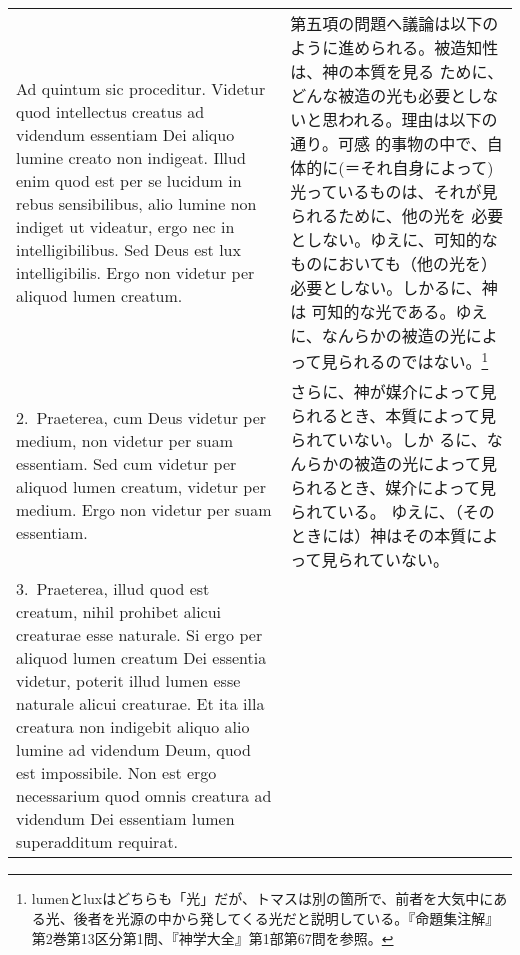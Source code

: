 \documentclass[10pt]{jsarticle} %
\begin{document}
\begin{longtable}{p{21em}p{21em}}
{\huge A}{\sc  d quintum sic proceditur}. Videtur quod intellectus creatus ad
 videndum essentiam Dei aliquo lumine creato non indigeat. Illud enim
 quod est per se lucidum in rebus sensibilibus, alio lumine non indiget
 ut videatur, ergo nec in intelligibilibus. Sed Deus est lux
 intelligibilis. Ergo non videtur per aliquod lumen creatum.

&

第五項の問題へ議論は以下のように進められる。被造知性は、神の本質を見る
ために、どんな被造の光も必要としないと思われる。理由は以下の通り。可感
的事物の中で、自体的に(＝それ自身によって)光っているものは、それが見られるために、他の光を
必要としない。ゆえに、可知的なものにおいても（他の光を）必要としない。しかるに、神は
可知的な光である。ゆえに、なんらかの被造の光によって見られるのではない。\footnote{lumenとluxはどちらも「光」だが、トマスは別の箇所で、前者を大気中にある光、後者を光源の中から発してくる光だと説明している。『命題集注解』第2巻第13区分第1問、『神学大全』第1部第67問を参照。}

\\

2.~{\sc Praeterea}, cum Deus videtur per medium, non videtur per suam
essentiam. Sed cum videtur per aliquod lumen creatum, videtur per
medium. Ergo non videtur per suam essentiam.

&

さらに、神が媒介によって見られるとき、本質によって見られていない。しか
るに、なんらかの被造の光によって見られるとき、媒介によって見られている。
ゆえに、（そのときには）神はその本質によって見られていない。

\\

3.~{\sc Praeterea}, illud quod est creatum, nihil prohibet alicui
creaturae esse naturale. Si ergo per aliquod lumen creatum Dei
essentia videtur, poterit illud lumen esse naturale alicui
creaturae. Et ita illa creatura non indigebit aliquo alio lumine ad
videndum Deum, quod est impossibile. Non est ergo necessarium quod
omnis creatura ad videndum Dei essentiam lumen superadditum requirat.

&


\end{longtable}
\end{document}
